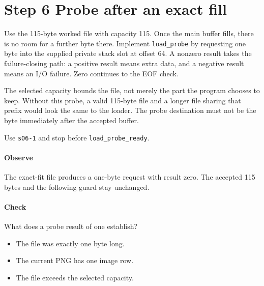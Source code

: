 \section{Step 6 Probe after an exact fill}\label{png-load-s06}
Use the 115-byte worked file with capacity 115. Once the main buffer fills, there is no room for a further byte there. Implement \texttt{load\_probe} by requesting one byte into the supplied private stack slot at offset 64. A nonzero result takes the failure-closing path: a positive result means extra data, and a negative result means an I/O failure. Zero continues to the EOF check.

The selected capacity bounds the file, not merely the part the program chooses to keep. Without this probe, a valid 115-byte file and a longer file sharing that prefix would look the same to the loader. The probe destination must not be the byte immediately after the accepted buffer.

Use \texttt{s06-1} and stop before \texttt{load\_probe\_ready}.

\paragraph{Observe} The exact-fit file produces a one-byte request with result zero. The accepted 115 bytes and the following guard stay unchanged.

\paragraph{Check} What does a probe result of one establish?
\begin{itemize}
  \item[A.] The file was exactly one byte long.
  \item[B.] The current PNG has one image row.
  \item[C.] The file exceeds the selected capacity.
\end{itemize}
